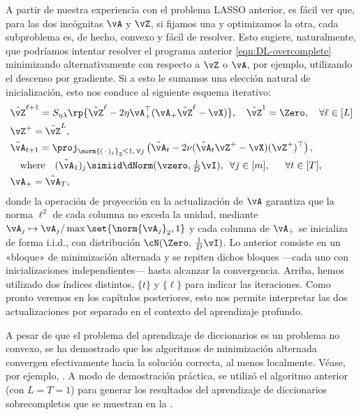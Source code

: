 \documentclass[../../book-main.tex]{subfiles}
\begin{document}
A partir de nuestra experiencia con el problema LASSO anterior, es fácil
ver que, para las dos incógnitas \(\vA\) y \(\vZ\), si fijamos una y optimizamos
la otra, cada subproblema es, de hecho, convexo y fácil de resolver.
Esto sugiere, naturalmente, que podríamos intentar resolver el programa anterior 
\eqref{eqn:DL-overcomplete} minimizando alternativamente con respecto a \(\vZ\) 
o \(\vA\), por ejemplo, utilizando el descenso por gradiente.
Si a esto le sumamos una elección natural de inicialización, esto nos conduce al siguiente
esquema iterativo:
\begin{align}
    &\tilde{\vZ}^{\ell + 1} = S_{\eta\lambda}\rp{\tilde{\vZ}^{\ell}
    - 2\eta\vA_{+}^{\top}(\vA_{+}\tilde{\vZ}^{\ell} - \vX)},
    \quad \tilde{\vZ}^1 = \Zero,
    \quad \forall \ell \in [L] \label{eqn:ISTA-update}\\
    &\vZ^+ = \tilde{\vZ}^L,\\
    &\tilde{\vA}_{t + 1} = \proj_{\norm{(\,\cdot\,)_j}_2 \leq
    1,\,\forall j}\left(
        \tilde{\vA}_{t} - 2\nu (\tilde{\vA}_{t}\vZ^+ - \vX)(\vZ^+)^\top
    \right), \nonumber \\
    &\quad\mbox{where} \quad (\tilde{\vA}_{1})_j \simiid \dNorm(\vzero,
    \tfrac{1}{D}\vI), \enspace \forall
    j \in [m],
    \quad\;\; \forall t \in [T],\label{eqn:DL-update}\\
    &\vA_+ = \tilde{\vA}_T,
\end{align}
donde la operación de proyección en la actualización de $\vA$ garantiza 
que la norma $\ell^2$ de cada columna no exceda la unidad, 
mediante $\vA_j \mapsto \vA_j / \max \set{\norm{\vA_j}_2,1}$ y 
cada columna de $\vA_+$ se inicializa de forma i.i.d., con 
distribución $\cN(\Zero,\,\tfrac{1}{D}\vI)$.
Lo anterior consiste en un «bloque» de minimización alternada
y se repiten dichos bloques ---cada uno con inicializaciones 
independientes--- hasta alcanzar la convergencia.
Arriba, hemos utilizado dos índices distintos, $\{t\}$ y $\{\ell\}$
para indicar las iteraciones. Como pronto veremos en los capítulos posteriores, esto nos 
permite interpretar las dos actualizaciones por separado en el 
contexto del aprendizaje profundo.

A pesar de que el problema del aprendizaje de diccionarios es un problema no convexo,
se ha demostrado que los algoritmos de minimización alternada convergen efectivamente hacia
la solución correcta, al menos localmente. Véase, por ejemplo, \cite{alekh-2016}.
A modo de demostración práctica, se utilizó el algoritmo anterior (con $L = T =
1$) para generar los resultados del aprendizaje de diccionarios sobrecompletos que se muestran en
la .
\end{document}
